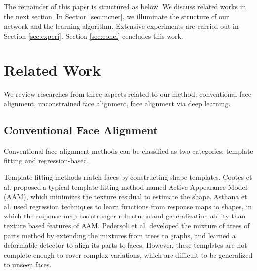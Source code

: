 \documentclass[journal]{IEEEtran}
\begin{document}
The remainder of this paper is structured as below. We discuss related works in the next section. In Section \ref{sec:mcnet}, we illuminate the structure of our network and the learning algorithm. Extensive experiments are carried out in Section \ref{sec:experi}. Section \ref{sec:concl} concludes this work.

\section{Related Work}
\label{sec:related}

We review researches from three aspects related to our method: conventional face alignment, unconstrained face alignment, face alignment via deep learning.

\subsection{Conventional Face Alignment}

Conventional face alignment methods can be classified as two categories: template fitting and regression-based.

Template fitting methods match faces by constructing shape templates. Cootes et al. \cite{cootes2001active} proposed a typical template fitting method named Active Appearance Model (AAM), which minimizes the texture residual to estimate the shape. Asthana et al. \cite{asthana2013robust} used regression techniques to learn functions from response maps to shapes, in which the response map has stronger robustness and generalization ability than texture based features of AAM. Pedersoli et al. \cite{pedersoli2014using} developed the mixture of trees of parts method by extending the mixtures from trees to graphs, and learned a deformable detector to align its parts to faces. However, these templates are not complete enough to cover complex variations, which are difficult to be generalized to unseen faces.
\end{document}

